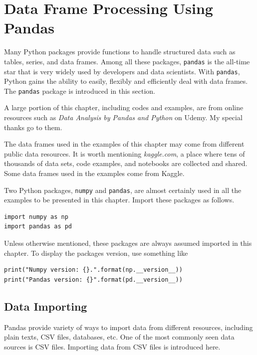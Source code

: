 \chapter{Data Frame Processing Using Pandas} \label{ch:pandas}

Many Python packages provide functions to handle structured data such as tables, series, and data frames. Among all these packages, \verb|pandas| is the all-time star that is very widely used by developers and data scientists. With \verb|pandas|, Python gains the ability to easily, flexibly and efficiently deal with data frames. The \verb|pandas| package is introduced in this section.

A large portion of this chapter, including codes and examples, are from online resources such as \textit{Data Analysis by Pandas and Python} on Udemy. My special thanks go to them.

The data frames used in the examples of this chapter may come from different public data resources. It is worth mentioning \textit{kaggle.com}, a place where tens of thousands of data sets, code examples, and notebooks are collected and shared. Some data frames used in the examples come from Kaggle.

Two Python packages, \verb|numpy| and \verb|pandas|, are almost certainly used in all the examples to be presented in this chapter. Import these packages as follows.
\begin{lstlisting}
import numpy as np
import pandas as pd
\end{lstlisting}
Unless otherwise mentioned, these packages are always assumed imported in this chapter. To display the packages version, use something like
\begin{lstlisting}
print("Numpy version: {}.".format(np.__version__))
print("Pandas version: {}".format(pd.__version__))
\end{lstlisting}

\section{Data Importing}

Pandas provide variety of ways to import data from different resources, including plain texts, CSV files, databases, etc. One of the most commonly seen data sources is CSV files. Importing data from CSV files is introduced here.

